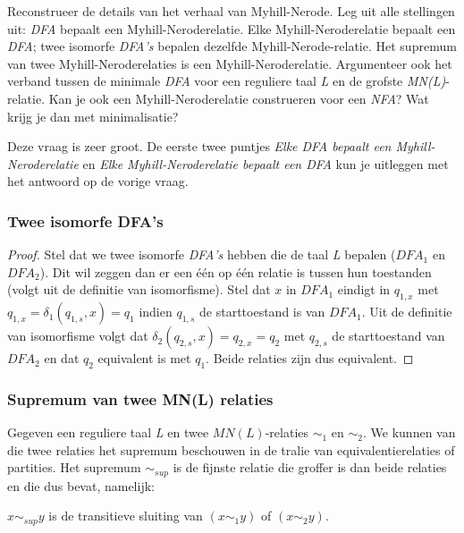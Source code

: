 \begin{quest}
  Reconstrueer de details van het verhaal van Myhill-Nerode. Leg uit alle stellingen uit: \emph{DFA} bepaalt een Myhill-Neroderelatie. Elke Myhill-Neroderelatie bepaalt een \emph{DFA}; twee isomorfe \emph{DFA's} bepalen dezelfde Myhill-Nerode-relatie. Het supremum van twee Myhill-Neroderelaties is een Myhill-Neroderelatie. Argumenteer ook het verband tussen de minimale \emph{DFA} voor een reguliere taal \emph{L} en de grofste \emph{MN(L)}-relatie.
  Kan je ook een Myhill-Neroderelatie construeren voor een \emph{NFA}? Wat krijg je dan met minimalisatie?
\end{quest}

Deze vraag is zeer groot. De eerste twee puntjes \emph{Elke DFA bepaalt een Myhill-Neroderelatie} en \emph{Elke Myhill-Neroderelatie bepaalt een DFA} kun je uitleggen met het antwoord op de vorige vraag.

\subsubsection*{Twee isomorfe DFA's}

\begin{proof}
  Stel dat we twee isomorfe \emph{DFA's} hebben die de taal \emph{L} bepalen ($DFA_1$ en $DFA_2$). Dit wil zeggen dan er een \'e\'en op \'e\'en relatie is tussen hun toestanden (volgt uit de definitie van isomorfisme). Stel dat $x$ in $DFA_1$ eindigt in $q_{1,x}$ met $q_{1,x} = \delta_1(q_{1,s},x) = q_1$ indien $q_{1,s}$ de starttoestand is van $DFA_1$. Uit de definitie van isomorfisme volgt dat $\delta_2(q_{2,s},x) = q_{2,x} = q_2$ met $q_{2,s}$ de starttoestand van $DFA_2$ en dat $q_2$ equivalent is met $q_1$. Beide relaties zijn dus equivalent.
\end{proof}

\subsubsection*{Supremum van twee MN(L) relaties}

Gegeven een reguliere taal \emph{L} en twee $MN(L)$-relaties $\sim_1$ en $\sim_2$. We kunnen van die twee relaties het supremum beschouwen in de tralie van equivalentierelaties of partities. Het supremum $\sim_{sup}$ is de fijnste relatie die groffer is dan beide relaties en die dus bevat, namelijk:

\begin{theorem}
  $x \sim_{sup} y$ is de transitieve sluiting van $(x \sim_1 y)$ of $(x \sim_2 y)$.
\end{theorem}

